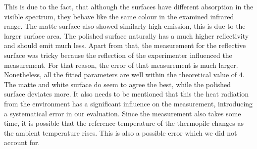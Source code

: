 \documentclass[a4paper,10pt,twocolumn]{article}
\begin{document}
    This is due to the fact, that although the surfaces have different absorption in the visible spectrum, they behave like the same colour in the examined infrared range.
    The matte surface also showed similarly high emission, this is due to the larger surface area.
    The polished surface naturally has a much higher reflectivity and should emit much less.
    Apart from that, the measurement for the reflective surface was tricky because the reflection of the experimenter influenced the measurement.
    For that reason, the error of that measurement is much larger.
    Nonetheless, all the fitted parameters are well within the theoretical value of $4$.
    The matte and white surface do seem to agree the best, while the polished surface deviates more.
    It also needs to be mentioned that this the heat radiation from the environment has a significant influence on the measurement, introducing a systematical error in our evaluation.
    Since the measurement also takes some time, it is possible that the reference temperature of the thermopile changes as the ambient temperature rises.
    This is also a possible error which we did not account for.
    
    
    
    
\end{document}
